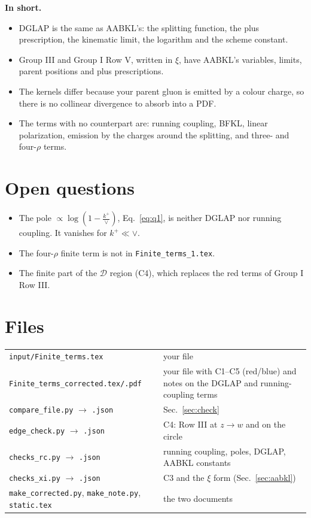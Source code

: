 \documentclass[9pt]{article}
\numberwithin{equation}{section}
\begin{document}
\noindent\textbf{In short.}
\begin{itemize}
\item DGLAP is the same as AABKL's: the splitting function, the plus prescription, the kinematic limit, the logarithm and the scheme constant.
\item Group III and Group I Row V, written in $\xi$, have AABKL's variables, limits, parent positions and plus prescriptions.
\item The kernels differ because your parent gluon is emitted by a colour charge, so there is no collinear divergence to absorb into a PDF.
\item The terms with no counterpart are: running coupling, BFKL, linear polarization, emission by the charges around the splitting, and three- and four-$\rho$ terms.
\end{itemize}

\section{Open questions}\label{sec:open}
\begin{itemize}
\item[Q1] The pole $\propto\log(1-\frac{k^+}{\vee})$, Eq.~\eqref{eq:q1}, is neither DGLAP nor running coupling. It vanishes for $k^+\ll\vee$.
\item[Q2] The four-$\rho$ finite term is not in \texttt{Finite\_terms\_1.tex}.
\item[Q3] The finite part of the $\mathcal D$ region (C4), which replaces the red terms of Group I Row III.
\end{itemize}

\section{Files}
\begin{center}\small
\begin{tabular}{@{}ll@{}}\toprule
\texttt{input/Finite\_terms.tex} & your file\\
\texttt{Finite\_terms\_corrected.tex/.pdf} & your file with C1--C5 (red/blue) and notes on the DGLAP and running-coupling terms\\
\texttt{compare\_file.py} $\to$ \texttt{.json} & Sec.~\ref{sec:check}\\
\texttt{edge\_check.py} $\to$ \texttt{.json} & C4: Row III at $z\to w$ and on the circle\\
\texttt{checks\_rc.py} $\to$ \texttt{.json} & running coupling, poles, DGLAP, AABKL constants\\
\texttt{checks\_xi.py} $\to$ \texttt{.json} & C3 and the $\xi$ form (Sec.~\ref{sec:aabkl})\\
\texttt{make\_corrected.py}, \texttt{make\_note.py}, \texttt{static.tex} & the two documents\\\bottomrule
\end{tabular}
\end{center}
\end{document}
